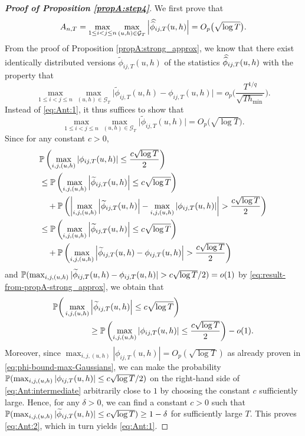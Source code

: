 \begin{proof}[\textnormal{\textbf{Proof of Proposition \ref{propA:step4}}}]
We first prove that 
\begin{equation}\label{eq:Ant:1} 
A_{n,T}  = \max_{1 \le i< j \le n} \max_{(u,h) \in \mathcal{G}_T} \Big|\doublehat{\phi}_{ij,T}(u,h)\Big| = O_p\big(\sqrt{\log T}\big).
\end{equation}
From the proof of Proposition \ref{propA:strong_approx}, we know that there exist identically distributed versions $\widetilde{\phi}_{ij, T}(u, h)$ of the statistics $\doublehat{\phi}_{ij,T}(u,h)$ with the property that 
\begin{equation}\label{eq:result-from-propA-strong_approx}
\max_{1\le i < j \le n} \max_{(u,h) \in \mathcal{G}_T} \big| \widetilde{\phi}_{ij, T}(u,h) - \phi_{ij, T}(u,h) \big| = o_p \Big( \frac{T^{1/q}}{\sqrt{Th_{\min}}} \Big). 
\end{equation}
Instead of \eqref{eq:Ant:1}, it thus suffices to show that 
\begin{equation}\label{eq:Ant:2} 
\max_{1 \le i< j \le n}\max_{(u,h) \in \mathcal{G}_T}\Big|\widetilde{\phi}_{ij, T}(u, h)\Big| = O_p\big(\sqrt{\log T}\big).
\end{equation}
Since for any constant $c > 0$, 
\begin{align*}
&\mathbb{P}\left( \max_{i,j,(u,h)}\left|\phi_{ij, T}(u, h)\right| \leq \frac{c \sqrt{\log T}}{2} \right) \\
&\leq \mathbb{P}\left( \max_{i,j,(u,h)}\left|\widetilde{\phi}_{ij, T}(u, h)\right| \leq c \sqrt{\log T}\right) \\
& \quad + \mathbb{P}\left(\left|\max_{i,j,(u,h)}\left|\widetilde{\phi}_{ij, T}(u, h)\right| - \max_{i,j,(u,h)}\left|\phi_{ij, T}(u, h)\right| \right| > \frac{c\sqrt{\log T}}{2}\right) \\
&\leq \mathbb{P}\left( \max_{i,j,(u,h)}\left|\widetilde{\phi}_{ij, T}(u, h)\right| \leq c \sqrt{\log T}\right) \\
&\quad + \mathbb{P}\left(\max_{i,j,(u,h)}\left|\widetilde{\phi}_{ij, T}(u, h)- \phi_{ij, T}(u, h)\right| > \frac{c\sqrt{\log T}}{2}\right)
\end{align*}
and $\mathbb{P}(\max_{i,j,(u,h)}|\widetilde{\phi}_{ij, T}(u, h)- \phi_{ij, T}(u, h)| > c \sqrt{\log T}/2) = o(1)$ by \eqref{eq:result-from-propA-strong_approx}, we obtain that
\begin{align} 
\mathbb{P}\bigg(\max_{i,j,(u,h)} & \left|\widetilde{\phi}_{ij, T}(u, h)\right| \leq c\sqrt{\log T} \bigg) \nonumber \\
 & \geq \mathbb{P}\left( \max_{i,j,(u,h)}\left|\phi_{ij, T}(u, h)\right| \leq \frac{c\sqrt{\log T}}{2}\right) - o(1). \label{eq:Ant:intermediate}
\end{align}
Moreover, since $\max_{i,j,(u,h)}\left|\phi_{ij, T}(u, h)\right| = O_p(\sqrt{\log{T}})$ as already proven in \eqref{eq:phi-bound-max-Gaussians}, we can make the probability $\mathbb{P}( \max_{i,j,(u,h)}|\phi_{ij, T}(u, h)| \leq c\sqrt{\log T}/2)$ on the right-hand side of \eqref{eq:Ant:intermediate} arbitrarily close to $1$ by choosing the constant $c$ sufficiently large. Hence, for any $\delta > 0$, we can find a constant $c > 0$ such that $\mathbb{P}(\max_{i,j,(u,h)}|\widetilde{\phi}_{ij, T}(u, h)| \leq c\sqrt{\log T} ) \ge 1 - \delta$ for sufficiently large $T$. This proves \eqref{eq:Ant:2}, which in turn yields \eqref{eq:Ant:1}. 



\end{proof}
